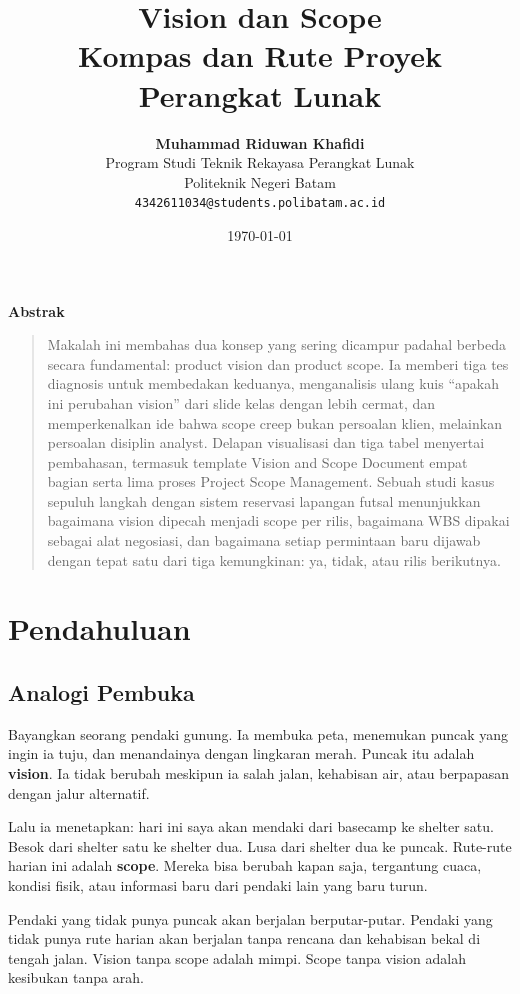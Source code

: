 \documentclass[11pt,a4paper]{article}
\title{\vspace{-1.5cm}\textbf{\sffamily\LARGE Vision dan Scope\\ Kompas dan Rute Proyek Perangkat Lunak}}
\author{
	\textbf{Muhammad Riduwan Khafidi} \\
	\small Program Studi Teknik Rekayasa Perangkat Lunak \\
	\small Politeknik Negeri Batam \\
	\small \texttt{4342611034@students.polibatam.ac.id}
}
\date{\small\today}
\renewenvironment{abstract}
{\small
	\begin{center}\textbf{\sffamily Abstrak}\end{center}
	\begin{quote}}
	{\end{quote}}
\begin{document}
\maketitle
\thispagestyle{empty}

\begin{abstract}
	Makalah ini membahas dua konsep yang sering dicampur padahal berbeda secara fundamental: product vision dan product scope. Ia memberi tiga tes diagnosis untuk membedakan keduanya, menganalisis ulang kuis ``apakah ini perubahan vision'' dari slide kelas dengan lebih cermat, dan memperkenalkan ide bahwa scope creep bukan persoalan klien, melainkan persoalan disiplin analyst. Delapan visualisasi dan tiga tabel menyertai pembahasan, termasuk template Vision and Scope Document empat bagian serta lima proses Project Scope Management. Sebuah studi kasus sepuluh langkah dengan sistem reservasi lapangan futsal menunjukkan bagaimana vision dipecah menjadi scope per rilis, bagaimana WBS dipakai sebagai alat negosiasi, dan bagaimana setiap permintaan baru dijawab dengan tepat satu dari tiga kemungkinan: ya, tidak, atau rilis berikutnya.
\end{abstract}

\section{Pendahuluan}

\subsection{Analogi Pembuka}

Bayangkan seorang pendaki gunung. Ia membuka peta, menemukan puncak yang ingin ia tuju, dan menandainya dengan lingkaran merah. Puncak itu adalah \textbf{vision}. Ia tidak berubah meskipun ia salah jalan, kehabisan air, atau berpapasan dengan jalur alternatif.

Lalu ia menetapkan: hari ini saya akan mendaki dari basecamp ke shelter satu. Besok dari shelter satu ke shelter dua. Lusa dari shelter dua ke puncak. Rute-rute harian ini adalah \textbf{scope}. Mereka bisa berubah kapan saja, tergantung cuaca, kondisi fisik, atau informasi baru dari pendaki lain yang baru turun.

Pendaki yang tidak punya puncak akan berjalan berputar-putar. Pendaki yang tidak punya rute harian akan berjalan tanpa rencana dan kehabisan bekal di tengah jalan. Vision tanpa scope adalah mimpi. Scope tanpa vision adalah kesibukan tanpa arah.
\end{document}
